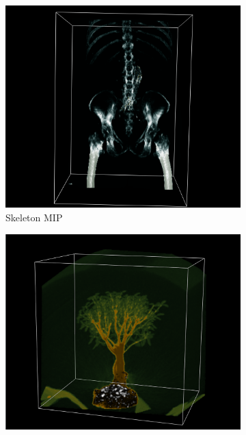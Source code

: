 \documentclass[a4paper,twoside,11pt]{article}
\begin{document}
\begin{figure}[h]
    \begin{center}
        \begin{subfigure}[b]{0.32\textwidth}
            \includegraphics[width=\textwidth]{SanderImages/SkeletonMIPZ.png}
            \caption{Skeleton MIP}
            \label{fig:Skeleton}
        \end{subfigure}
        \begin{subfigure}[b]{0.33\textwidth}
            \includegraphics[width=\textwidth]{SanderImages/BonsaiMIPZ.png}

\end{subfigure}
\end{center}
\end{figure}
\end{document}
